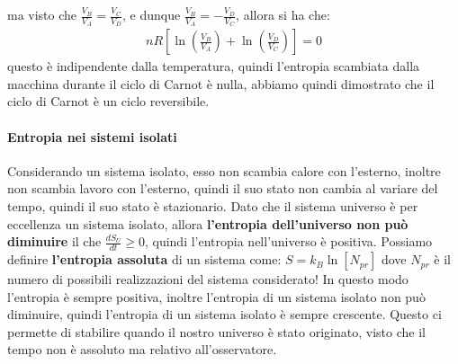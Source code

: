         ma visto che $\frac{V_B}{V_A} = \frac{V_C}{V_D}$, e dunque $\frac{V_B}{V_A} = -\frac{V_D}{V_C}$, allora si ha che:
        \begin{align*}
            nR\left[\operatorname{ln}\left(\frac{V_B}{V_A}\right) + \operatorname{ln}\left(\frac{V_D}{V_C}\right)\right] = 0
        \end{align*}
        questo è indipendente dalla temperatura, quindi l'entropia scambiata dalla macchina durante il ciclo di Carnot è nulla, abbiamo quindi dimostrato che il ciclo di Carnot è un ciclo reversibile.
    \paragraph{Entropia nei sistemi isolati}
        Considerando un sistema isolato, esso non scambia calore con l'esterno, inoltre non scambia lavoro con l'esterno, quindi il suo stato non cambia al variare del tempo, quindi il suo stato è stazionario. Dato che il sistema universo è per eccellenza un sistema isolato, allora \textbf{l'entropia dell'universo non può diminuire} il che $\frac{dS_U}{dt} \geq 0$, quindi l'entropia nell'universo è positiva. Possiamo definire \textbf{l'entropia assoluta} di un sistema come: $S = k_B \operatorname{ln} [N_{pr}]$ dove $N_{pr}$ è il numero di possibili realizzazioni del sistema considerato! In questo modo l'entropia è sempre positiva, inoltre l'entropia di un sistema isolato non può diminuire, quindi l'entropia di un sistema isolato è sempre crescente. Questo ci permette di stabilire quando il nostro universo è stato originato, visto che il tempo non è assoluto ma relativo all'osservatore.  